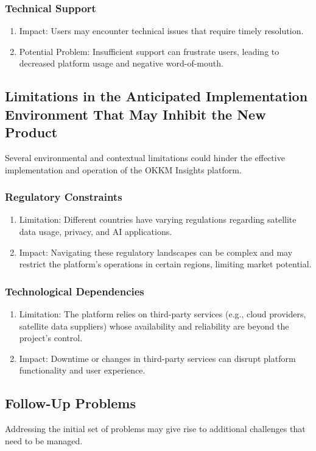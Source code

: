 \documentclass[12pt]{article}
\begin{document}
\subsubsection{Technical Support}
\begin{enumerate}
    \item Impact: Users may encounter technical issues that require timely resolution.
    \item Potential Problem: Insufficient support can frustrate users, leading to decreased platform usage and negative word-of-mouth.
\end{enumerate}
\subsection{Limitations in the Anticipated Implementation Environment That May
Inhibit the New Product}
Several environmental and contextual limitations could hinder the effective implementation and operation of the OKKM Insights platform.
\subsubsection{Regulatory Constraints}
\begin{enumerate}
    \item Limitation: Different countries have varying regulations regarding satellite data usage, privacy, and AI applications.
    \item Impact: Navigating these regulatory landscapes can be complex and may restrict the platform's operations in certain regions, limiting market potential.
\end{enumerate}
\subsubsection{Technological Dependencies}
\begin{enumerate}
    \item Limitation: The platform relies on third-party services (e.g., cloud providers, satellite data suppliers) whose availability and reliability are beyond the project's control.
    \item Impact: Downtime or changes in third-party services can disrupt platform functionality and user experience.
\end{enumerate}
\subsection{Follow-Up Problems}
Addressing the initial set of problems may give rise to additional challenges that need to be managed.
\end{document}
